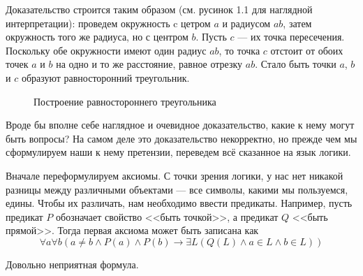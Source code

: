 Доказательство строится таким образом (см. русинок 1.1 для наглядной интерпретации): проведем окружность c цетром $a$ и радиусом $ab$, затем окружность того же радиуса, но с центром $b$. Пусть $c$ --- их точка пересечения. Поскольку обе окружности имеют один радиус $ab$, то точка $c$ отстоит от обоих точек $a$ и $b$ на одно и то же расстояние, равное отрезку $ab$. Стало быть точки $a$, $b$ и $c$ образуют равносторонний треугольник.

\begin{figure}[h]
\centering
{}
\caption{Построение равностороннего треугольника}
\end{figure}

Вроде бы вполне себе наглядное и очевидное доказательство, какие к нему могут быть вопросы? На самом деле это доказательство некорректно, но прежде чем мы сформулируем наши к нему претензии, переведем всё сказанное на язык логики.

Вначале переформулируем аксиомы. С точки зрения логики, у нас нет никакой разницы между различными объектами --- все символы, какими мы пользуемся, едины. Чтобы их различать, нам необходимо ввести предикаты. Например, пусть предикат $P$ обозначает свойство <<быть точкой>>, а предикат $Q$ <<быть прямой>>. Тогда первая аксиома может быть записана как $$\forall a \forall b (a\not=b \land P(a) \land P(b) \to \exists L (Q(L) \land a \in L \land b \in L))$$

Довольно неприятная формула. 